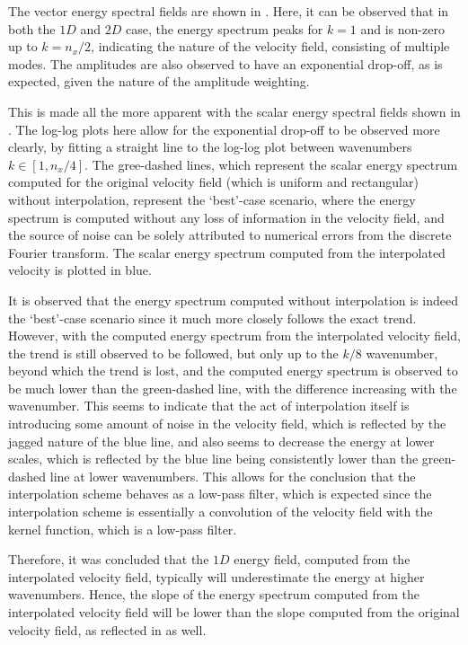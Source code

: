 The vector energy spectral fields are shown in . Here, it can be observed that in both the $1D$ and $2D$ case, the energy spectrum peaks for $k=1$ and is non-zero up to $k=n_x/2$, indicating the nature of the velocity field, consisting of multiple modes. The amplitudes are also observed to have an exponential drop-off, as is expected, given the nature of the amplitude weighting.

This is made all the more apparent with the scalar energy spectral fields shown in . The log-log plots here allow for the exponential drop-off to be observed more clearly, by fitting a straight line to the log-log plot between wavenumbers $k \in [1, n_x/4]$. The gree-dashed lines, which represent the scalar energy spectrum computed for the original velocity field (which is uniform and rectangular) without interpolation, represent the `best'-case scenario, where the energy spectrum is computed without any loss of information in the velocity field, and the source of noise can be solely attributed to numerical errors from the discrete Fourier transform. The scalar energy spectrum computed from the interpolated velocity is plotted in blue.

It is observed that the energy spectrum computed without interpolation is indeed the `best'-case scenario since it much more closely follows the exact trend. However, with the computed energy spectrum from the interpolated velocity field, the trend is still observed to be followed, but only up to the $k/8$ wavenumber, beyond which the trend is lost, and the computed energy spectrum is observed to be much lower than the green-dashed line, with the difference increasing with the wavenumber.
This seems to indicate that the act of interpolation itself is introducing some amount of noise in the velocity field, which is reflected by the jagged nature of the blue line, and also seems to decrease the energy at lower scales, which is reflected by the blue line being consistently lower than the green-dashed line at lower wavenumbers. This allows for the conclusion that the interpolation scheme behaves as a low-pass filter, which is expected since the interpolation scheme is essentially a convolution of the velocity field with the kernel function, which is a low-pass filter.

Therefore, it was concluded that the $1D$ energy field, computed from the interpolated velocity field, typically will underestimate the energy at higher wavenumbers. Hence, the slope of the energy spectrum computed from the interpolated velocity field will be lower than the slope computed from the original velocity field, as reflected in  as well.

